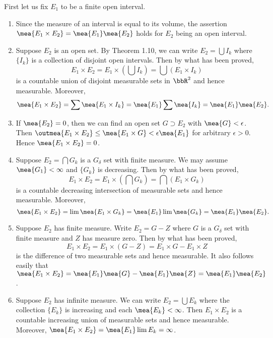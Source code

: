 \begin{exercise}{3.12}
  First let us fix $E_1$ to be a finite open interval.

  \begin{enumerate}[noitemsep]
  \item
  Since the measure of an interval is equal to its volume,
  the assertion $\mea{E_1 \times E_2} = \mea{E_1} \mea{E_2}$ holds
  for $E_2$ being an open interval.

  \item
  Suppose $E_2$ is an open set.
  By Theorem 1.10,
  we can write $E_2 = \bigcup I_k$
  where $\{I_k\}$ is a collection of disjoint open intervals.
  Then by what has been proved,
  \[
    E_1 \times E_2 = E_1 \times \left( \bigcup I_k \right)
    = \bigcup \left(E_1 \times I_k\right)
  \]
  is a countable union of disjoint measurable sets in $\bbR^2$
  and hence measurable.
  Moreover,
  \[
    \mea{E_1 \times E_2} = \sum \mea{E_1 \times I_k}
    = \mea{E_1} \sum \mea{I_k} = \mea{E_1} \mea{E_2}.
  \]

  \item
  If $\mea{E_2} = 0$, then we can find an open set $G \supset E_2$
  with $\mea{G} < \epsilon$. Then
  $\outmea{E_1 \times E_2} \le \mea{E_1 \times G} < \epsilon \mea{E_1}$
  for arbitrary $\epsilon > 0$.
  Hence $\mea{E_1 \times E_2} = 0$.

  \item
  Suppose $E_2 = \bigcap G_k$ is a $G_\delta$ set with finite measure.
  We may assume $\mea{G_1} < \infty$ and $\{G_k\}$ is decreasing.
  Then by what has been proved,
  \[
    E_1 \times E_2 = E_1 \times \left( \bigcap G_k \right)
    = \bigcap \left( E_1 \times G_k \right)
  \]
  is a countable decreasing intersection of measurable sets
  and hence measurable.
  Moreover,
  \[
    \mea{E_1 \times E_2}
    = \lim \mea{E_1 \times G_k}
    = \mea{E_1} \lim \mea{G_k} = \mea{E_1} \mea{E_2}.
  \]

  \item
  Suppose $E_2$ has finite measure.
  Write $E_2 = G - Z$ where $G$ is a $G_{\delta}$ set with finite measure
  and $Z$ has measure zero. Then by what has been proved,
  \[
    E_1 \times E_2 = E_1 \times \left( G-Z \right)
    = E_1 \times G - E_1 \times Z
  \]
  is the difference of two measurable sets and hence measurable.
  It also follows easily that
  $\mea{E_1 \times E_2} = \mea{E_1}\mea{G} - \mea{E_1}\mea{Z} = \mea{E_1}\mea{E_2}$.

  \item
  Suppose $E_2$ has infinite measure.
  We can write $E_2 = \bigcup E_k$
  where the collection $\{E_k\}$ is increasing and each $\mea{E_k} < \infty$.
  Then $E_1 \times E_2$ is a countable increasing union of measurable sets
  and hence measurable.
  Moreover, $\mea{E_1 \times E_2} = \mea{E_1} \lim {E_k} = \infty$.
  \end{enumerate}


\end{exercise}
